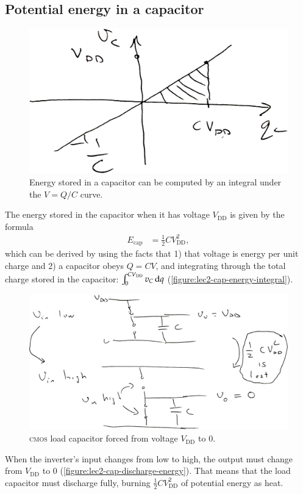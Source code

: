 \subsection{Potential energy in a capacitor}
\begin{figure}
  \centering
  \includegraphics[width=0.75\linewidth]{figures/cap-energy-integral}
  \caption{Energy stored in a capacitor can be computed by an integral under the \(V = Q/C\) curve.}
  \label{figure:lec2-cap-energy-integral}
\end{figure}
The energy stored in the capacitor when it has voltage \(V_\text{DD}\) is given by the formula
\begin{align}
  E_\text{cap}
  &= \frac{1}{2} CV_\text{DD}^2,
\end{align}
which can be derived by using the facts that 1) that voltage is energy per unit charge and 2) a capacitor obeys \(Q = CV\), and integrating through the total charge stored in the capacitor: \(\int_0^{CV_\text{DD}} v_C \dif q\) (\autoref{figure:lec2-cap-energy-integral}).

\begin{figure}
  \centering
  \includegraphics[width=1\linewidth]{figures/cap-discharge-energy}
  \caption{\textsc{cmos} load capacitor forced from voltage \(V_\text{DD}\) to \(0\).}
  \label{figure:lec2-cap-discharge-energy}
\end{figure}
When the inverter's input changes from low to high, the output must change from \(V_\text{DD}\) to \(0\) (\autoref{figure:lec2-cap-discharge-energy}).
That means that the load capacitor must discharge fully, burning \(\frac{1}{2}CV_\text{DD}^2\) of potential energy as heat.

